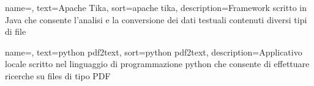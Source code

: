 {
	name=,
	text=Apache Tika,
	sort=apache tika,
	description={\gls{Framework} scritto in \gls{Java} che consente l'analisi e la conversione dei dati testuali contenuti diversi tipi di file}
}

{
	name=,
	text=python pdf2text,
	sort=python pdf2text,
	description={Applicativo locale scritto nel linguaggio di programmazione python che consente di effettuare ricerche su files di tipo PDF}
}